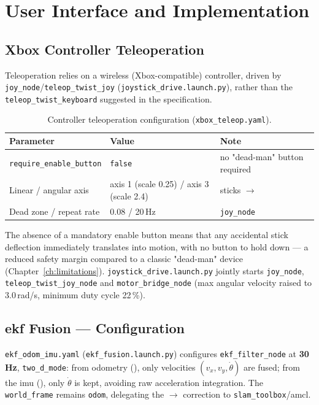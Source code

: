\chapter{User Interface and Implementation}
\label{ch:ihm}

\section{Xbox Controller Teleoperation}
\label{sec:ihm_teleop}

Teleoperation relies on a wireless (Xbox-compatible) controller, driven by
\texttt{joy\_node}/\texttt{teleop\_twist\_joy} (\texttt{joystick\_drive.launch.py}),
rather than the \texttt{teleop\_twist\_keyboard} suggested in the specification.

\begin{table}[H]
	\centering
	\caption{Controller teleoperation configuration (\texttt{xbox\_teleop.yaml}).}
	\label{tab:teleop_params}
	\begin{tabularx}{\linewidth}{L{5.5cm} C{2.6cm} L{4.3cm}}
		\toprule
		\textbf{Parameter} & \textbf{Value} & \textbf{Note} \\
		\midrule
		\texttt{require\_enable\_button} & \texttt{false} & no "dead-man" button required \\
		Linear / angular axis & axis 1 (scale 0.25) / axis 3 (scale 2.4) & sticks $\to$  \\
		Dead zone / repeat rate & 0.08 / 20\,Hz & \texttt{joy\_node} \\
		\bottomrule
	\end{tabularx}
\end{table}

The absence of a mandatory enable button means that any accidental stick deflection
immediately translates into motion, with no button to hold down --- a reduced safety
margin compared to a classic "dead-man" device (Chapter~\ref{ch:limitations}).
\texttt{joystick\_drive.launch.py} jointly starts \texttt{joy\_node},
\texttt{teleop\_twist\_joy\_node} and \texttt{motor\_bridge\_node} (max angular velocity
raised to 3.0\,rad/s, minimum duty cycle 22\,\%).

\section{\gls{ekf} Fusion --- Configuration}
\label{sec:ihm_ekf_detail}

\texttt{ekf\_odom\_imu.yaml} (\texttt{ekf\_fusion.launch.py}) configures
\texttt{ekf\_filter\_node} at \textbf{30\,Hz}, \texttt{two\_d\_mode}: from odometry
(), only velocities $(v_x,v_y,\dot\theta)$ are fused; from the
\gls{imu} (), only $\dot\theta$ is kept, avoiding raw acceleration
integration. The \texttt{world\_frame} remains \texttt{odom}, delegating the
$\to$ correction to \texttt{slam\_toolbox}/\gls{amcl}.

